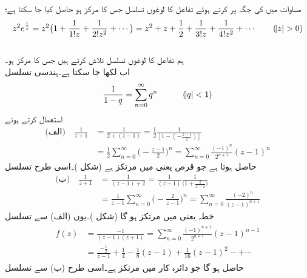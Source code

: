 \quad
مساوات  میں  کی جگہ  پر کرتے ہوئے  تفاعل  کا لوغوں تسلسل جس کا مرکز  ہو  حاصل کیا جا سکتا ہے؛
\begin{align*}
z^2e^{\frac{1}{z}}=z^2\big(1+\frac{1}{1!z}+\frac{1}{2!z^2}+\cdots\big)=z^2+z+\frac{1}{2}+\frac{1}{3!z}+\frac{1}{4!z^2}+\cdots\quad \quad (\abs{z}>0)
\end{align*}
\quad {}\\
ہم تفاعل  کا لوغوں تسلسل تلاش کرتے ہیں جس کا مرکز  ہو۔\\
اب  لکھا جا سکتا ہے۔ہندسی تسلسل
\begin{align*}
\frac{1}{1-q}=\sum\limits_{n=0}^{\infty} q^n\quad \quad \quad (\abs{q}<1)
\end{align*}
استعمال کرتے ہوئے 
\begin{align*}
\text{(الف)}\quad \frac{1}{z+1}&=\frac{1}{2+(z-1)}=\frac{1}{2}\frac{1}{[1-(-\frac{z-1}{2})]}\\
&=\frac{1}{2}\sum\limits_{n=0}^{\infty}\big(-\frac{z-1}{2}\big)^n=\sum\limits_{n=0}^{\infty} \frac{(-1)^n}{2^{n+1}}(z-1)^n
\end{align*}
حاصل ہوتا ہے جو قرص  یعنی  میں مرتکز ہے (شکل )۔اسی طرح  تسلسل
\begin{align*}
\text{(ب)}\quad \frac{1}{z+1}&=\frac{1}{(z-1)+2}=\frac{1}{(z-1)}\frac{1}{\big(1+\frac{2}{z-1}\big)}\\
&=\frac{1}{z-1}\sum\limits_{n=0}^{\infty} \big(-\frac{2}{z-1}\big)^n=\sum\limits_{n=0}^{\infty}\frac{(-2)^n}{(z-1)^{n+1}}
\end{align*}
خطہ   یعنی  میں مرتکز ہو گا (شکل )۔یوں (الف) سے  تسلسل
\begin{gather}
\begin{aligned}\label{مساوات_ٹیلر_چھلا_پہلا}
f(z)&=\frac{-1}{(z-1)(z+1)}=\sum\limits_{n=0}^{\infty} \frac{(-1)^{n+1}}{2^{n+1}}(z-1)^{n-1}\\
&=\frac{-\tfrac{1}{2}}{z-1}+\frac{1}{4}-\frac{1}{8}(z-1)+\frac{1}{16}(z-1)^2-+\cdots
\end{aligned}
\end{gather}
حاصل ہو گا جو دائرہ کار  میں مرتکز ہے۔اسی طرح (ب) سے تسلسل
